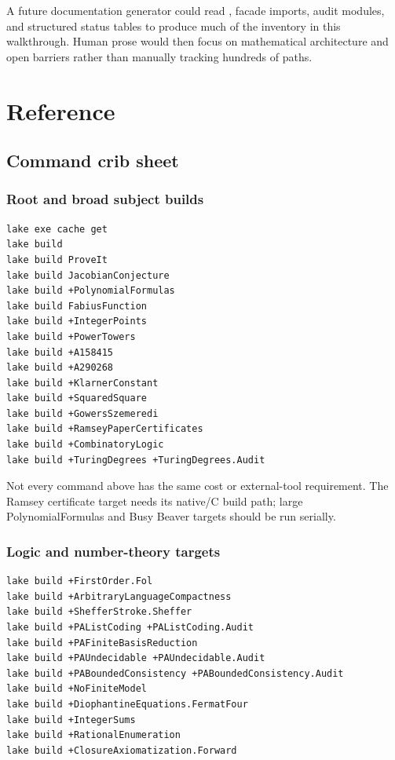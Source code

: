 \documentclass[
  10pt,
  a4paper,
  twoside,
  open=any,
  parskip=half,
  headings=big
]{scrreprt}
\newcommand{\code}[1]{\texttt{\detokenize{#1}}}
\begin{document}
A future documentation generator could read \code{lakefile.toml}, facade imports, audit modules, and structured status tables to produce much of the inventory in this walkthrough. Human prose would then focus on mathematical architecture and open barriers rather than manually tracking hundreds of paths.

\part{Reference}

\appendix

\chapter{Command crib sheet}
\label{app:commands}

\section{Root and broad subject builds}

\begin{lstlisting}[language=bash]
lake exe cache get
lake build
lake build ProveIt
lake build JacobianConjecture
lake build +PolynomialFormulas
lake build FabiusFunction
lake build +IntegerPoints
lake build +PowerTowers
lake build +A158415
lake build +A290268
lake build +KlarnerConstant
lake build +SquaredSquare
lake build +GowersSzemeredi
lake build +RamseyPaperCertificates
lake build +CombinatoryLogic
lake build +TuringDegrees +TuringDegrees.Audit
\end{lstlisting}

Not every command above has the same cost or external-tool requirement. The Ramsey certificate target needs its native/C build path; large PolynomialFormulas and Busy Beaver targets should be run serially.

\section{Logic and number-theory targets}

\begin{lstlisting}[language=bash]
lake build +FirstOrder.Fol
lake build +ArbitraryLanguageCompactness
lake build +ShefferStroke.Sheffer
lake build +PAListCoding +PAListCoding.Audit
lake build +PAFiniteBasisReduction
lake build +PAUndecidable +PAUndecidable.Audit
lake build +PABoundedConsistency +PABoundedConsistency.Audit
lake build +NoFiniteModel
lake build +DiophantineEquations.FermatFour
lake build +IntegerSums
lake build +RationalEnumeration
lake build +ClosureAxiomatization.Forward
\end{lstlisting}
\end{document}
